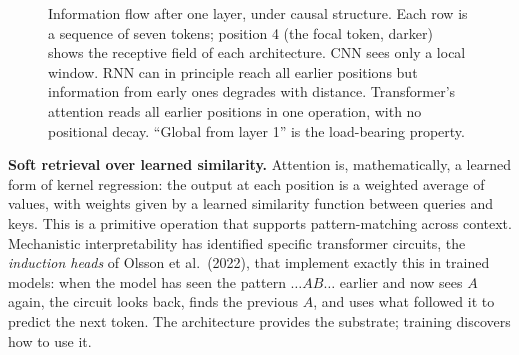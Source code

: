 \begin{figure}[h]
\centering
{}
\caption{Information flow after one layer, under causal structure. Each row is a sequence of seven tokens; position 4 (the focal token, darker) shows the receptive field of each architecture. CNN sees only a local window. RNN can in principle reach all earlier positions but information from early ones degrades with distance. Transformer's attention reads all earlier positions in one operation, with no positional decay. ``Global from layer 1'' is the load-bearing property.}
\label{fig:info-flow}
\end{figure}

\textbf{Soft retrieval over learned similarity.} Attention is, mathematically, a learned form of kernel regression: the output at each position is a weighted average of values, with weights given by a learned similarity function between queries and keys. This is a primitive operation that supports pattern-matching across context. Mechanistic interpretability has identified specific transformer circuits, the \emph{induction heads} of Olsson et al.\ (2022), that implement exactly this in trained models: when the model has seen the pattern $\ldots A B \ldots$ earlier and now sees $A$ again, the circuit looks back, finds the previous $A$, and uses what followed it to predict the next token. The architecture provides the substrate; training discovers how to use it.

